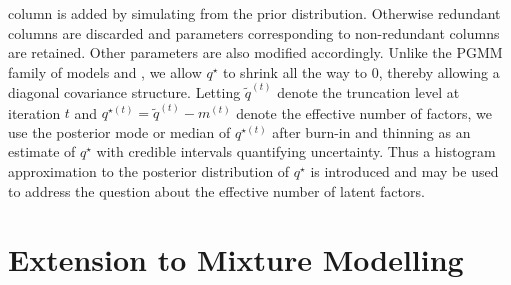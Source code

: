 \documentclass[a4paper,12pt,fleqn]{article}
\numberwithin{equation}{section}
\begin{document}
column is added by simulating from the prior distribution. Otherwise redundant columns are discarded and parameters corresponding to non-redundant columns are retained. Other parameters are also modified accordingly. Unlike the PGMM family of models and \citet{Bhattacharya2011}, we allow $q^{\star}$ to shrink all the way to 0, thereby allowing a diagonal covariance structure. Letting $\tilde{q}^{\left(t\right)}$ denote the truncation level at iteration $t$ and $q^{\star\left(t\right)} = \tilde{q}^{\left(t\right)} - m^{\left(t\right)}$ denote the effective number of factors, we use the posterior mode or median of $q^{\star\left(t\right)}$ after burn-in and thinning as an estimate of $q^\star$ with credible intervals quantifying uncertainty. Thus a histogram approximation to the posterior distribution of $q^\star$ is introduced and may be used to address the question about the effective number of latent factors.

\section[Extension to Mixture Modelling]{Extension to Mixture Modelling}
\end{document}
